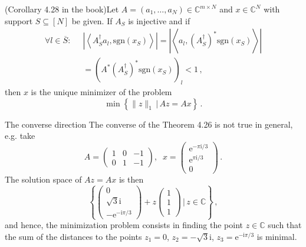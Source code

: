 \documentclass[11pt]{beamer}
\newcommand{\CC}{\mathbb{C}}
\newcommand{\sgn}{\text{sgn}}
\newcommand{\p}[2]{\left\langle #1,#2\right\rangle}
\newcommand{\I}{\mathrm{i}}
\newcommand{\e}{\mathrm{e}}
\begin{document}
\begin{frame}
		\begin{Kor}
			{(Corollary 4.28 in the book)}{}Let \(A=(a_1,\ldots,a_N)\in\CC^{m\times N}\) and \(x\in\CC^N\) with support \(S\subseteq[N]\) be given. If \(A_S\) is injective and if 
			\begin{align*}
			\forall l\in \overline S:\;\;&\left|\p{A_S^{\dagger}a_l}{\sgn(x_S)}\right|=\left|\p{a_l}{(A_S^{\dagger})^*\sgn(x_S)}\right|\\
			&=\left(A^*(A_S^{\dagger})^*\sgn(x_S)\right)_l<1\,,
			\end{align*}
			then \(x\) is the unique minimizer of the problem
			\[\min\left\{\|z\|_1\,\big|\,Az=Ax\right\}\,.\]
		\end{Kor}

\end{frame}

\begin{frame}{The converse direction}
	 The converse of the Theorem 4.26 is not true in general, e.g. take 
		\[ A=\begin{pmatrix}1&0&-1\\0&1&-1\end{pmatrix}, \;\;x=\begin{pmatrix}\e^{-\pi \I/3}\\\e^{\pi \I/3}\\0\end{pmatrix}\,.\]
		The solution space of $Az=Ax$ is then 
		\[\left\{\begin{pmatrix}
		0\\\sqrt 3 \I\\-\e^{-\I \pi/3}
		\end{pmatrix}+z\begin{pmatrix}
		1\\1\\1
		\end{pmatrix}\,\bigg|\, z\in \CC\right\}\,,\]
		and hence, the minimization problem consists in finding the point \(z\in \CC\) such that the sum of the distances to the points \(z_1=0\), \(z_2=-\sqrt 3\I\), \(z_3=\e^{-\I \pi/3}\) is minimal.
\end{frame}
\end{document}
